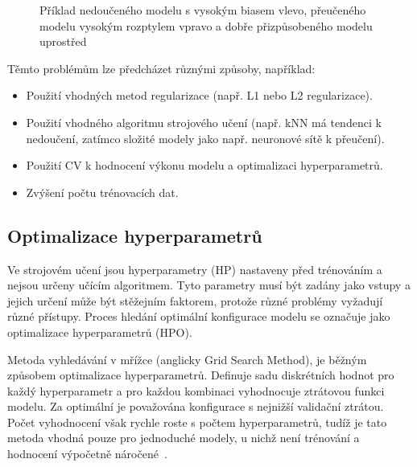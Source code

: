 \begin{figure}[!htb]
\begin{center}
        \caption{Příklad nedoučeného modelu s vysokým biasem vlevo, přeučeného
            modelu vysokým rozptylem vpravo a dobře přizpůsobeného modelu uprostřed~\cite{overunderfit}}
        \label{fig:overunderfit}
    \end{center}
\end{figure}

\noindent Těmto problémům lze předcházet různými způsoby, například:
\begin{itemize}
    \item Použití vhodných metod regularizace (např. L1 nebo L2 regularizace).
    \item Použití vhodného algoritmu strojového učení (např. kNN má tendenci k
          nedoučení, zatímco složité modely jako např. neuronové sítě k přeučení).
    \item Použití CV k hodnocení výkonu modelu a optimalizaci hyperparametrů.
    \item Zvýšení počtu trénovacích dat.
\end{itemize}

\subsection{Optimalizace hyperparametrů}
\label{subsec:hyperparametry}
Ve strojovém učení jsou hyperparametry (HP) nastaveny před trénováním a nejsou
určeny učícím algoritmem. Tyto parametry musí být zadány jako vstupy a jejich
určení může být stěžejním faktorem, protože různé problémy vyžadují různé
přístupy. Proces hledání optimální konfigurace modelu se označuje jako
optimalizace hyperparametrů (HPO).

Metoda vyhledávání v mřížce (anglicky Grid Search Method), je běžným způsobem
optimalizace hyperparametrů. Definuje sadu diskrétních hodnot pro každý
hyperparametr a pro každou kombinaci vyhodnocuje ztrátovou funkci modelu. Za
optimální je považována konfigurace s nejnižší validační ztrátou. Počet
vyhodnocení však rychle roste s počtem hyperparametrů, tudíž je tato metoda
vhodná pouze pro jednoduché modely, u nichž není trénování a hodnocení
výpočetně náročené~\cite{Liashchynskyi2019}.

